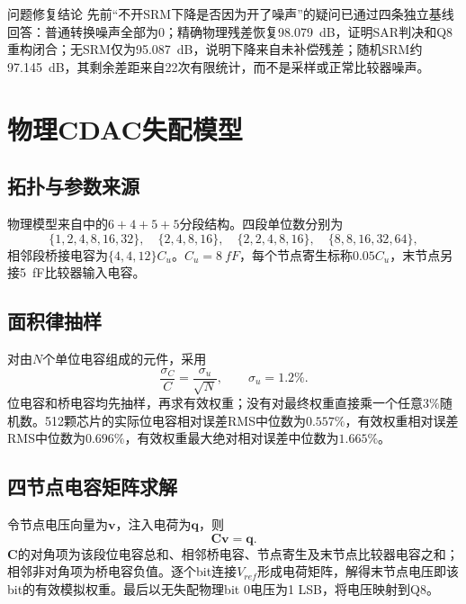 \documentclass[11pt,a4paper,UTF8,fontset=none,openany]{ctexrep}
\numberwithin{equation}{chapter}
\numberwithin{figure}{chapter}
\numberwithin{table}{chapter}
\begin{document}
\begin{passbox}{问题修复结论}
先前“不开SRM下降是否因为开了噪声”的疑问已通过四条独立基线回答：普通转换噪声全部为0；精确物理残差恢复\SI{98.079}{dB}，证明SAR判决和Q8重构闭合；无SRM仅为\SI{95.087}{dB}，说明下降来自未补偿残差；随机SRM约\SI{97.145}{dB}，其剩余差距来自22次有限统计，而不是采样或正常比较器噪声。
\end{passbox}

\chapter{物理CDAC失配模型}

\section{拓扑与参数来源}

物理模型来自中的$6+4+5+5$分段结构。四段单位数分别为
\begin{equation}
\{1,2,4,8,16,32\},\quad
\{2,4,8,16\},\quad
\{2,2,4,8,16\},\quad
\{8,8,16,32,64\},
\end{equation}
相邻段桥接电容为$\{4,4,12\}C_u$。$C_u=\SI{8}{fF}$，每个节点寄生标称$0.05C_u$，末节点另接\SI{5}{fF}比较器输入电容。

\section{面积律抽样}

对由$N$个单位电容组成的元件，采用
\begin{equation}
\frac{\sigma_C}{C}=\frac{\sigma_u}{\sqrt{N}},\qquad \sigma_u=1.2\%.
\end{equation}
位电容和桥电容均先抽样，再求有效权重；没有对最终权重直接乘一个任意$3\%$随机数。512颗芯片的实际位电容相对误差RMS中位数为$0.557\%$，有效权重相对误差RMS中位数为$0.696\%$，有效权重最大绝对相对误差中位数为$1.665\%$。

\section{四节点电容矩阵求解}

令节点电压向量为$\bm{v}$，注入电荷为$\bm{q}$，则
\begin{equation}
\bm{C}\bm{v}=\bm{q}.
\end{equation}
$\bm{C}$的对角项为该段位电容总和、相邻桥电容、节点寄生及末节点比较器电容之和；相邻非对角项为桥电容负值。逐个bit连接$V_{ref}$形成电荷矩阵，解得末节点电压即该bit的有效模拟权重。最后以无失配物理bit 0电压为1 LSB，将电压映射到Q8。
\end{document}
